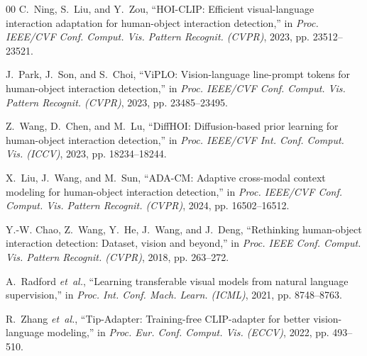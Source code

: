 \documentclass[conference]{IEEEtran}
\begin{document}
\begin{thebibliography}{00}
C.~Ning, S.~Liu, and Y.~Zou, ``HOI-CLIP: Efficient visual-language interaction adaptation for human-object interaction detection,'' in \emph{Proc. IEEE/CVF Conf. Comput. Vis. Pattern Recognit. (CVPR)}, 2023, pp. 23512--23521.

J.~Park, J.~Son, and S.~Choi, ``ViPLO: Vision-language line-prompt tokens for human-object interaction detection,'' in \emph{Proc. IEEE/CVF Conf. Comput. Vis. Pattern Recognit. (CVPR)}, 2023, pp. 23485--23495.

Z.~Wang, D.~Chen, and M.~Lu, ``DiffHOI: Diffusion-based prior learning for human-object interaction detection,'' in \emph{Proc. IEEE/CVF Int. Conf. Comput. Vis. (ICCV)}, 2023, pp. 18234--18244.

X.~Liu, J.~Wang, and M.~Sun, ``ADA-CM: Adaptive cross-modal context modeling for human-object interaction detection,'' in \emph{Proc. IEEE/CVF Conf. Comput. Vis. Pattern Recognit. (CVPR)}, 2024, pp. 16502--16512.

Y.-W. Chao, Z.~Wang, Y.~He, J.~Wang, and J.~Deng, ``Rethinking human-object interaction detection: Dataset, vision and beyond,'' in \emph{Proc. IEEE Conf. Comput. Vis. Pattern Recognit. (CVPR)}, 2018, pp. 263--272.

A.~Radford \emph{et~al.}, ``Learning transferable visual models from natural language supervision,'' in \emph{Proc. Int. Conf. Mach. Learn. (ICML)}, 2021, pp. 8748--8763.

R.~Zhang \emph{et~al.}, ``Tip-Adapter: Training-free CLIP-adapter for better vision-language modeling,'' in \emph{Proc. Eur. Conf. Comput. Vis. (ECCV)}, 2022, pp. 493--510.

\end{thebibliography}
\end{document}
